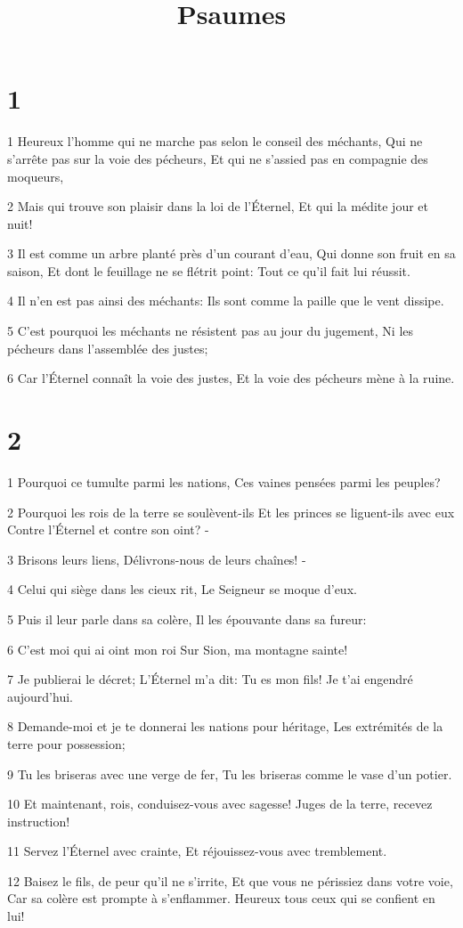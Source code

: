 

\title{Psaumes}


\chapter{1}

\par 1 Heureux l'homme qui ne marche pas selon le conseil des méchants, Qui ne s'arrête pas sur la voie des pécheurs, Et qui ne s'assied pas en compagnie des moqueurs,
\par 2 Mais qui trouve son plaisir dans la loi de l'Éternel, Et qui la médite jour et nuit!
\par 3 Il est comme un arbre planté près d'un courant d'eau, Qui donne son fruit en sa saison, Et dont le feuillage ne se flétrit point: Tout ce qu'il fait lui réussit.
\par 4 Il n'en est pas ainsi des méchants: Ils sont comme la paille que le vent dissipe.
\par 5 C'est pourquoi les méchants ne résistent pas au jour du jugement, Ni les pécheurs dans l'assemblée des justes;
\par 6 Car l'Éternel connaît la voie des justes, Et la voie des pécheurs mène à la ruine.

\chapter{2}

\par 1 Pourquoi ce tumulte parmi les nations, Ces vaines pensées parmi les peuples?
\par 2 Pourquoi les rois de la terre se soulèvent-ils Et les princes se liguent-ils avec eux Contre l'Éternel et contre son oint? -
\par 3 Brisons leurs liens, Délivrons-nous de leurs chaînes! -
\par 4 Celui qui siège dans les cieux rit, Le Seigneur se moque d'eux.
\par 5 Puis il leur parle dans sa colère, Il les épouvante dans sa fureur:
\par 6 C'est moi qui ai oint mon roi Sur Sion, ma montagne sainte!
\par 7 Je publierai le décret; L'Éternel m'a dit: Tu es mon fils! Je t'ai engendré aujourd'hui.
\par 8 Demande-moi et je te donnerai les nations pour héritage, Les extrémités de la terre pour possession;
\par 9 Tu les briseras avec une verge de fer, Tu les briseras comme le vase d'un potier.
\par 10 Et maintenant, rois, conduisez-vous avec sagesse! Juges de la terre, recevez instruction!
\par 11 Servez l'Éternel avec crainte, Et réjouissez-vous avec tremblement.
\par 12 Baisez le fils, de peur qu'il ne s'irrite, Et que vous ne périssiez dans votre voie, Car sa colère est prompte à s'enflammer. Heureux tous ceux qui se confient en lui!

